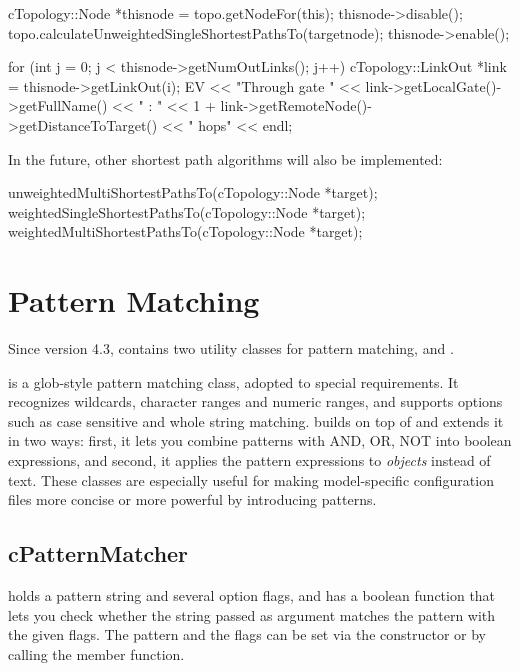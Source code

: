 \begin{cpp}
cTopology::Node *thisnode = topo.getNodeFor(this);
thisnode->disable();
topo.calculateUnweightedSingleShortestPathsTo(targetnode);
thisnode->enable();

for (int j = 0; j < thisnode->getNumOutLinks(); j++) {
  cTopology::LinkOut *link = thisnode->getLinkOut(i);
  EV << "Through gate " << link->getLocalGate()->getFullName() << " : "
     << 1 + link->getRemoteNode()->getDistanceToTarget() << " hops" << endl;
}
\end{cpp}

In the future, other shortest path algorithms will also be implemented:

\begin{cpp}
unweightedMultiShortestPathsTo(cTopology::Node *target);
weightedSingleShortestPathsTo(cTopology::Node *target);
weightedMultiShortestPathsTo(cTopology::Node *target);
\end{cpp}



\section{Pattern Matching}
\label{sec:sim-lib:pattern-matching}

Since version 4.3, {\opp} contains two utility classes for pattern
matching,  and .

 is a glob-style pattern matching class, adopted to
special {\opp} requirements. It recognizes wildcards, character ranges and
numeric ranges, and supports options such as case sensitive and whole
string matching.  builds on top of
 and extends it in two ways: first, it lets you
combine patterns with AND, OR, NOT into boolean expressions, and second, it
applies the pattern expressions to \textit{objects} instead of text. These
classes are especially useful for making model-specific configuration files
more concise or more powerful by introducing patterns.



\subsection{cPatternMatcher}
\label{sec:sim-lib:cpatternmatcher}

 holds a pattern string and several option flags, and has
a boolean  function that lets you check whether the string passed as argument
matches the pattern with the given flags. The pattern and the flags can be set
via the constructor or by calling the  member function.

